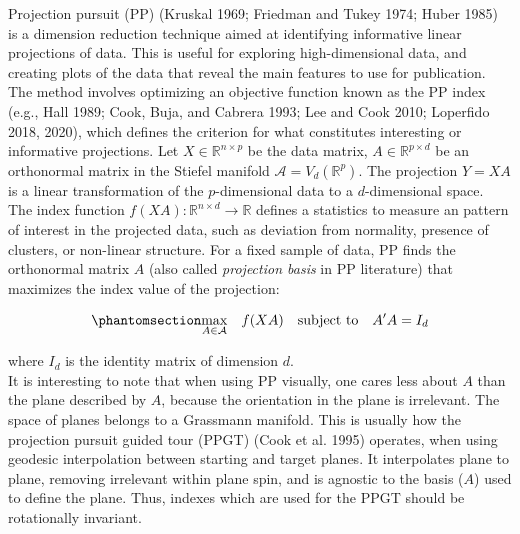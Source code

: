 \documentclass[
  12pt,
]{interact}
\theoremstyle{plain}
\begin{document}
Projection pursuit (PP) (Kruskal 1969; Friedman and Tukey 1974; Huber
1985) is a dimension reduction technique aimed at identifying
informative linear projections of data. This is useful for exploring
high-dimensional data, and creating plots of the data that reveal the
main features to use for publication. The method involves optimizing an
objective function known as the PP index (e.g., Hall 1989; Cook, Buja,
and Cabrera 1993; Lee and Cook 2010; Loperfido 2018, 2020), which
defines the criterion for what constitutes interesting or informative
projections. Let \(X \in \mathbb{R}^{n\times p}\) be the data matrix,
\(A \in\mathbb{R}^{p \times d}\) be an orthonormal matrix in the Stiefel
manifold \(\mathcal{A} = V_d(\mathbb{R}^p)\). The projection \(Y = XA\)
is a linear transformation of the \(p\)-dimensional data to a
\(d\)-dimensional space. The index function
\(f(XA): \mathbb{R}^{n \times d} \to \mathbb{R}\) defines a statistics
to measure an pattern of interest in the projected data, such as
deviation from normality, presence of clusters, or non-linear structure.
For a fixed sample of data, PP finds the orthonormal matrix \(A\) (also
called \emph{projection basis} in PP literature) that maximizes the
index value of the projection:

\begin{equation}\phantomsection\label{eq-optimization}{
\underset{A \in \mathcal{A}}{\max } \quad f(XA) \quad \text{subject to} \quad A'A = I_d
}\end{equation}

where \(I_d\) is the identity matrix of dimension \(d\).\\
It is interesting to note that when using PP visually, one cares less
about \(A\) than the plane described by \(A\), because the orientation
in the plane is irrelevant. The space of planes belongs to a Grassmann
manifold. This is usually how the projection pursuit guided tour (PPGT)
(Cook et al. 1995) operates, when using geodesic interpolation between
starting and target planes. It interpolates plane to plane, removing
irrelevant within plane spin, and is agnostic to the basis (\(A\)) used
to define the plane. Thus, indexes which are used for the PPGT should be
rotationally invariant.
\end{document}
